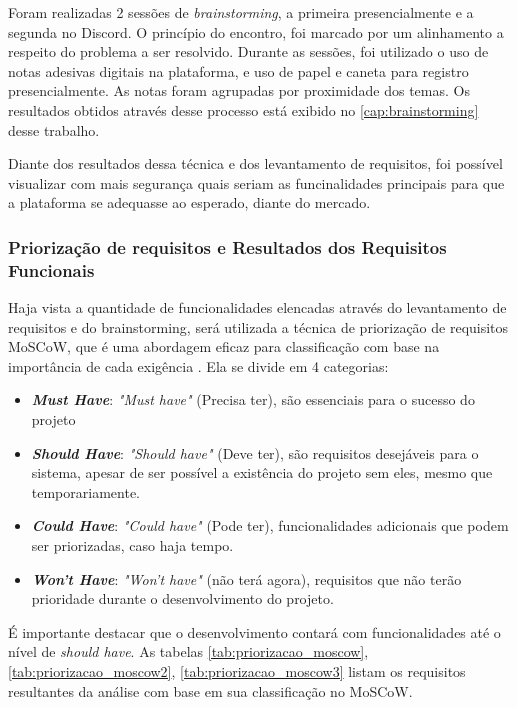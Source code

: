         Foram realizadas 2 sessões de \textit{brainstorming}, a primeira presencialmente e a segunda no Discord. O princípio do encontro, foi marcado por um alinhamento a respeito do problema a ser resolvido. Durante as sessões, foi utilizado o uso de notas adesivas digitais na plataforma, e uso de papel e caneta para registro presencialmente. As notas foram agrupadas por proximidade dos temas. Os resultados obtidos através desse processo está exibido no \ref{cap:brainstorming} desse trabalho. 

        Diante dos resultados dessa técnica e dos levantamento de requisitos, foi possível visualizar com mais segurança quais seriam as funcinalidades principais para que a plataforma se adequasse ao esperado, diante do mercado.

        \subsubsection{Priorização de requisitos e Resultados dos Requisitos Funcionais}
        \label{sec:priorizacao}
        Haja vista a quantidade de funcionalidades elencadas através do levantamento de requisitos e do brainstorming, será utilizada a técnica de priorização de requisitos MoSCoW, que é uma abordagem eficaz para classificação com base na importância de cada exigência \cite{cottrell1999}. Ela se divide em 4 categorias:

        \begin{itemize}
            \item \textbf{\textit{Must Have}}: \textit{"Must have"} (Precisa
            ter), são essenciais para o sucesso do projeto
            \item \textbf{\textit{Should Have}}: \textit{"Should have"} (Deve ter), são requisitos desejáveis para o sistema, apesar de ser possível a existência do projeto sem eles, mesmo que temporariamente.
            \item \textbf{\textit{Could Have}}: \textit{"Could have"} (Pode ter), funcionalidades adicionais que podem ser priorizadas, caso haja tempo.
            \item \textbf{\textit{Won’t Have}}: \textit{"Won’t have"} (não terá agora), requisitos que não terão prioridade durante o desenvolvimento do projeto.
        \end{itemize}

        É importante destacar que o desenvolvimento contará com funcionalidades até o nível de \textit{should have}.
        As tabelas \ref{tab:priorizacao_moscow}, \ref{tab:priorizacao_moscow2}, \ref{tab:priorizacao_moscow3} listam os requisitos resultantes da análise com base em sua classificação no MoSCoW.

